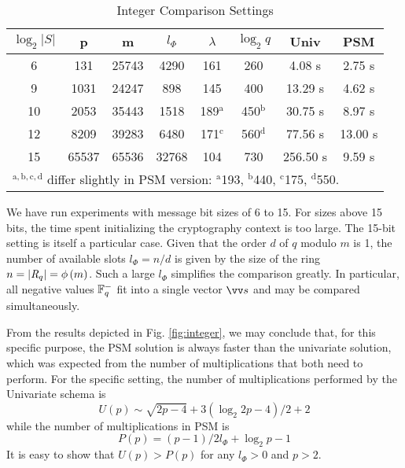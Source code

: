 \begin{table}[htbp]
\setlength\tabcolsep{3pt}
\caption{Integer Comparison Settings}
\begin{center}
\begin{tabular}{cccccccc}
\hline
$\log_2{|S|}$ & p & m & $l_{\Phi}$ & $\lambda$ & $\log_2{q}$ & Univ & PSM \\ \hline
6 & 131 & 25743 & 4290 & 161 & 260 & 4.08 s & 2.75 s\\ 
9 & 1031 & 24247 & 898 & 145 & 400 & 13.29 s & 4.62 s \\
10 & 2053 & 35443 & 1518 & 189$^\mathrm{a}$ & 450$^\mathrm{b}$ & 30.75 s & 8.97 s\\
12 & 8209 & 39283 & 6480 & 171$^\mathrm{c}$ & 560$^\mathrm{d}$ & 77.56 s & 13.00 s\\
15 & 65537 & 65536 & 32768 & 104 & 730 & 256.50 s & 9.59 s\\
\hline
\multicolumn{8}{l}{$^\mathrm{a,b,c,d}$ differ slightly in PSM version: $^{\mathrm{a}}$193, $^{\mathrm{b}}$440, $^{\mathrm{c}}$175, $^{\mathrm{d}}$550.}
\end{tabular}
\label{tab:integer}
\end{center}
\end{table}

We have run experiments with message bit sizes of 6 to 15. For sizes above 15 bits, the time spent initializing the cryptography context is too large. The 15-bit setting is itself a particular case. Given that the order $d$ of $q$ modulo $m$ is 1, the number of available slots $l_{\Phi}=n/d$ is given by the size of the ring $n=|\mathit{R}_q|=\phi\left(m\right)$. Such a large $l_{\Phi}$ simplifies the comparison greatly. In particular, all negative values $\mathbb{F}_q^{-}$ fit into a single vector $\vs$ and may be compared simultaneously.

From the results depicted in Fig. \ref{fig:integer}, we may conclude that, for this specific purpose, the PSM solution is always faster than the univariate solution, which was expected from the number of multiplications that both need to perform. For the specific setting, the number of multiplications performed by the Univariate schema is 
\[U(p) \sim \sqrt{2p-4}+3(\log_2{2p-4})/2 + 2\]
while the number of multiplications in PSM is
\[P(p)= (p-1)/2l_{\Phi} + \log_2{p-1}\]
It is easy to show that $U(p)>P(p)$ for any $l_{\Phi}>0$ and $p>2$.

